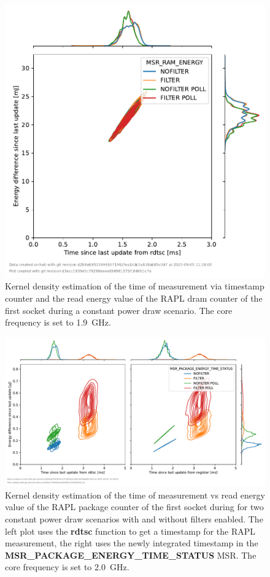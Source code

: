 \begin{figure}[]
    \centering
    \includegraphics[width=0.54\columnwidth]{fig/rapl-update-intervals/MSR_RAM_ENERGY_1900000.pdf}
    \caption{Kernel density estimation of the time of measurement via timestamp counter and the read energy value of the RAPL dram counter of the first socket during a constant power draw scenario.
    The core frequency is set to \SI{1.9}{\GHz}.}
\end{figure}

\clearpage
\begin{figure}[]
    \centering
    \includegraphics[width=\columnwidth]{fig/rapl-update-intervals/MSR_PACKAGE_ENERGY_TIME_STATUS_2000000.pdf}
    \caption{Kernel density estimation of the time of measurement vs read energy value of the RAPL package counter of the first socket during for two constant power draw scenarios with and without filters enabled.
    The left plot uses the \textbf{rdtsc} function to get a timestamp for the RAPL measurement, the right uses the newly integrated timestamp in the \textbf{MSR\_PACKAGE\_ENERGY\_TIME\_STATUS} MSR.
    The core frequency is set to \SI{2.0}{\GHz}.}
\end{figure}

